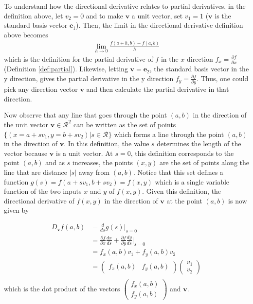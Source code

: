 \documentclass[
]{book}
\theoremstyle{definition}
\theoremstyle{definition}
\theoremstyle{definition}
\theoremstyle{definition}
\theoremstyle{remark}
\begin{document}
To understand how the directional derivative relates to partial derivatives, in the definition above, let \(v_2 = 0\) and to make \(\mathbf{v}\) a unit vector, set \(v_1 = 1\) (\(\mathbf{v}\) is the standard basis vector \(\mathbf{e}_1\)). Then, the limit in the directional derivative definition above becomes
\[
\begin{aligned}
\lim_{h \rightarrow 0} \frac{f(a + h, b) - f(a, b)}{h}
\end{aligned}
\]
which is the definition for the partial derivative of \(f\) in the \(x\) direction \(f_x = \frac{\partial f}{\partial x}\) (Definition \ref{def:partial}). Likewise, letting \(\mathbf{v} = \mathbf{e}_2\), the standard basis vector in the y direction, gives the partial derivative in the y direction \(f_y = \frac{\partial f}{\partial y}\). Thus, one could pick any direction vector \(\mathbf{v}\) and then calculate the partial derivative in that direction.

Now observe that any line that goes through the point \((a, b)\) in the direction of the unit vector \(\mathbf{v} \in \mathcal{R}^2\) can be written as the set of points \(\{(x = a + s v_1, y = b + s v_2) | s \in \mathcal{R} \}\) which forms a line through the point \((a, b)\) in the direction of \(\mathbf{v}\). In this definition, the value \(s\) determines the length of the vector because \(\mathbf{v}\) is a unit vector. At \(s=0\), this definition corresponds to the point \((a, b)\) and as \(s\) increases, the points \((x, y)\) are the set of points along the line that are distance \(|s|\) away from \((a, b)\). Notice that this set defines a function \(g(s) = f(a + s v_1, b + s v_2) = f(x, y)\) which is a single variable function of the two inputs \(x\) and \(y\) of \(f(x, y)\). Given this definition, the directional derivative of \(f(x, y)\) in the direction of \(\mathbf{v}\) at the point \((a, b)\) is now given by

\[
\begin{aligned}
D_{\mathbf{v}} f(a, b) & = \frac{d}{ds}g(s)|_{s=0} \\
& = \frac{\partial f}{\partial x} \frac{dx}{ds} + \frac{\partial f}{\partial y} \frac{dy}{ds} |_{s=0} \\
& = f_x(a, b) v_1 + f_y(a, b) v_2 \\
& = \begin{pmatrix} f_x(a, b) & f_y(a, b) \end{pmatrix} \begin{pmatrix} v_1 \\ v_2 \end{pmatrix} \\
\end{aligned}
\]
which is the dot product of the vectors \(\begin{pmatrix} f_x(a, b) \\ f_y(a, b) \end{pmatrix}\) and \(\mathbf{v}\).
\end{document}
